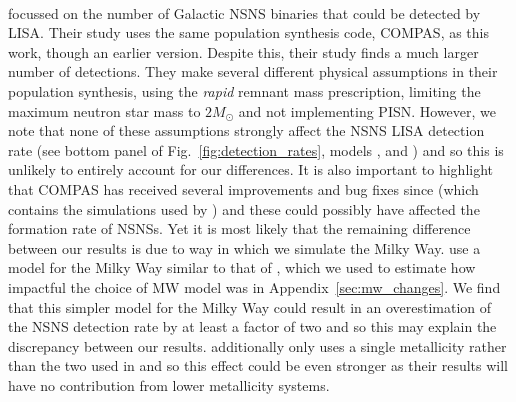 \paragraph{\citet{Lau+2020}} focussed on the number of Galactic NSNS binaries that could be detected by LISA. Their study uses the same population synthesis code, COMPAS, as this work, though an earlier version. Despite this, their study finds a much larger number of detections. They make several different physical assumptions in their population synthesis, using the \citet{Fryer+2012} \textit{rapid} remnant mass prescription, limiting the maximum neutron star mass to $2 \unit{M_{\odot}}$ and not implementing PISN. However, we note that none of these assumptions strongly affect the NSNS LISA detection rate (see bottom panel of Fig.~\ref{fig:detection_rates}, models \modRapid{}, \modNSLow{} and \modNoPISN{}) and so this is unlikely to entirely account for our differences. It is also important to highlight that COMPAS has received several improvements and bug fixes since \citet{Vigna-Gomez+2018} (which contains the simulations used by \citet{Lau+2020}) and these could possibly have affected the formation rate of NSNSs.
%
Yet it is most likely that the remaining difference between our results is due to way in which we simulate the Milky Way. \citet{Lau+2020} use a model for the Milky Way similar to that of \citet{Breivik+2020}, which we used to estimate how impactful the choice of MW model was in Appendix~\ref{sec:mw_changes}. We find that this simpler model for the Milky Way could result in an overestimation of the NSNS detection rate by at least a factor of two and so this may explain the discrepancy between our results. \citet{Lau+2020} additionally only uses a single metallicity rather than the two used in \citet{Breivik+2020} and so this effect could be even stronger as their results will have no contribution from lower metallicity systems.

